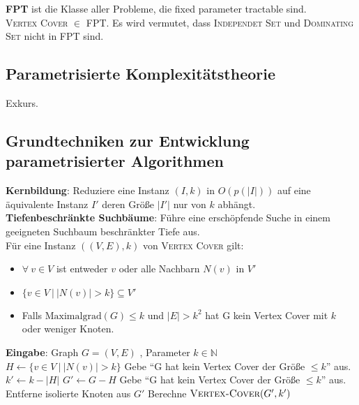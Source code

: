 \documentclass[a4paper,10pt]{scrartcl}
\newcommand{\tbf}{\textbf}
\newcommand{\tsc}{\textsc}
\newcommand{\agn}{\leftarrow}
\newcommand{\nat}{\mathbb{N}}
\newcommand{\Gr}{$G = (V,E)$ }
\newcommand{\Eingabe}[1]{\STATE \tbf{Eingabe}: #1 \\}
\begin{document}
\tbf{FPT} ist die Klasse aller Probleme, die fixed parameter tractable sind. \\

\tsc{Vertex Cover} $\in$ FPT. Es wird vermutet, dass \tsc{Independet Set} und \tsc{Dominating Set} nicht in FPT sind. \\

\subsection{Parametrisierte Komplexitätstheorie}
Exkurs. \\

\subsection{Grundtechniken zur Entwicklung parametrisierter Algorithmen}
\tbf{Kernbildung}: Reduziere eine Instanz $(I,k)$ in $O(p(|I|))$ auf eine äquivalente Instanz $I'$ deren Größe $|I'|$ nur von $k$ abhängt. \\

\tbf{Tiefenbeschränkte Suchbäume}: Führe eine erschöpfende Suche in einem geeigneten Suchbaum beschränkter Tiefe aus. \\

Für eine Instanz $((V,E),k)$ von \tsc{Vertex Cover} gilt: 
\begin{itemize}
 \item $\forall \ v \in V$ ist entweder $v$ oder alle Nachbarn $N(v)$ in $V'$
 \item $\{ v \in V \ | \ |N(v)| > k \} \subseteq V'$
 \item Falls $\text{Maximalgrad}(G) \leq k$ und $|E| > k^2$ hat G kein Vertex Cover mit $k$ oder weniger Knoten.
\end{itemize}

\begin{algorithm}
\caption{$\tsc{Vertex-Cover}(G,k) \in O(nk + 2^k \cdot k^2)$}
\begin{algorithmic}
\Eingabe{Graph \Gr, Parameter $k \in \nat$}
\STATE $H \agn \{ v \in V \ | \ |N(v)| > k \}$
	\STATE Gebe ``G hat kein Vertex Cover der Größe $\leq k$'' aus.
\ELSE
	\STATE $k' \agn k - |H|$
	\STATE $G' \agn G - H$ 
		\STATE Gebe ``G hat kein Vertex Cover der Größe $\leq k$'' aus.
	\ELSE
		\STATE Entferne isolierte Knoten aus $G'$
		\STATE Berechne $\tsc{Vertex-Cover}(G',k')$
	\ENDIF
\ENDIF

\end{algorithmic}
\end{algorithm}
\end{document}
